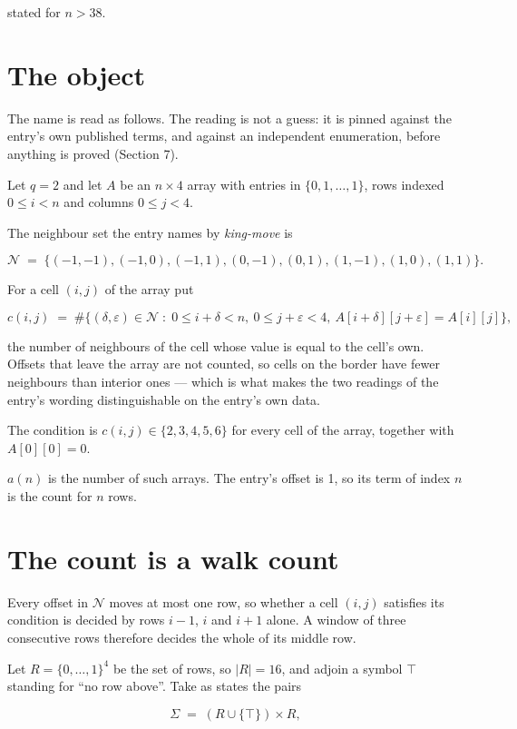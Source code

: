 \documentclass[11pt]{article}
\theoremstyle{definition}
\begin{document}
stated for $n > 38$.

\section{The object}

The name is read as follows. The reading is not a guess: it is pinned against the entry's own published terms, and against an independent enumeration, before anything is proved (Section 7).

Let $q = 2$ and let $A$ be an $n \times 4$ array with entries in $\{0,1,\dots,1\}$, rows indexed $0 \le i < n$ and columns $0 \le j < 4$.

The neighbour set the entry names by {\itshape king-move} is

\[\mathcal{N} \;=\; \{(-1,-1), (-1,0), (-1,1), (0,-1), (0,1), (1,-1), (1,0), (1,1)\}.\]

For a cell $(i,j)$ of the array put

\[c(i,j) \;=\; \#\bigl\{(\delta,\varepsilon)\in\mathcal{N} \;:\; 0\le i+\delta<n,\ 0\le j+\varepsilon<4,\ A[i+\delta][j+\varepsilon] = A[i][j]\bigr\},\]

the number of neighbours of the cell whose value is equal to the cell's own. Offsets that leave the array are not counted, so cells on the border have fewer neighbours than interior ones --- which is what makes the two readings of the entry's wording distinguishable on the entry's own data.

The condition is $c(i,j) \in \{2, 3, 4, 5, 6\}$ for every cell of the array, together with $A[0][0]=0$.

$a(n)$ is the number of such arrays. The entry's offset is 1, so its term of index $n$ is the count for $n$ rows.

\section{The count is a walk count}

Every offset in $\mathcal{N}$ moves at most one row, so whether a cell $(i,j)$ satisfies its condition is decided by rows $i-1$, $i$ and $i+1$ alone. A window of three consecutive rows therefore decides the whole of its middle row.

Let $R = \{0,\dots,1\}^{4}$ be the set of rows, so $|R| = 16$, and adjoin a symbol $\top$ standing for ``no row above''. Take as states the pairs

\[\Sigma \;=\; (R \cup \{\top\}) \times R,\]
\end{document}
